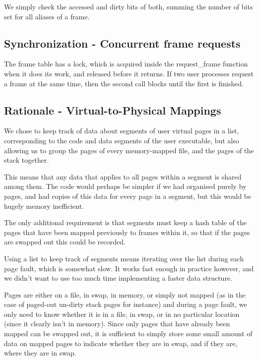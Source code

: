 
We simply check the accessed and dirty bits of both, summing the number of bits
set for all aliases of a frame.

\subsection{Synchronization - Concurrent frame requests}


The frame table has a lock, which is acquired inside the request\_frame
function when it does its work, and released before it returns. If two user
processes request a frame at the same time, then the second call blocks
until the first is finished.

\subsection{Rationale - Virtual-to-Physical Mappings}


We chose to keep track of data about segments of user virtual pages in a list,
corresponding to the code and data segments of the user executable, but also
allowing us to group the pages of every memory-mapped file, and the pages of the
stack together.

This means that any data that applies to all pages within a segment is shared
among them. The code would perhaps be simpler if we had organised purely by
pages, and had copies of this data for every page in a segment, but this would
be hugely memory inefficient.

The only additional requirement is that segments must keep a hash table of the
pages that have been mapped previously to frames within it, so that if the pages
are swapped out this could be recorded.

Using a list to keep track of segments means iterating over the list during each
page fault, which is somewhat slow. It works fast enough in practice however,
and we didn't want to use too much time implementing a faster data structure.

Pages are either on a file, in swap, in memory, or simply not mapped (as in the
case of paged-out un-dirty stack pages for instance) and during a page fault, we
only need to know whether it is in a file, in swap, or in no particular location
(since it clearly isn't in memory). Since only pages that have already been
mapped can be swapped out, it is sufficient to simply store some small amount of
data on mapped pages to indicate whether they are in swap, and if they are,
where they are in swap.

